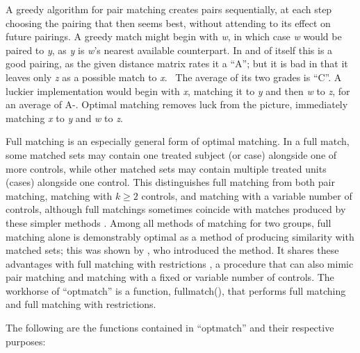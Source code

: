 \documentclass[12pt,twoside]{article}
\begin{document}
\bigskip

{\ttfamily
\textrm{ A greedy algorithm for pair matching creates pairs
sequentially, at each step choosing the pairing that then seems best,
without attending to its effect on future pairings. A greedy match
might begin with }\textrm{\textit{w}}\textrm{, in which case
}\textrm{\textit{w}}\textrm{ would be paired to
}\textrm{\textit{y}}\textrm{, as }\textrm{\textit{y}}\textrm{ is
}\textrm{\textit{w}}\textrm{'s nearest available counterpart. In and of
itself this is a good pairing, as the given distance matrix rates it a
``A''; but it is bad in that it leaves only
}\textrm{\textit{z}}\textrm{ as a possible match to
}\textrm{\textit{x}}\textrm{. \ The average of its two grades is ``C''.
A luckier implementation would begin with }\textrm{\textit{x}}\textrm{,
matching it to }\textrm{\textit{y}}\textrm{ and then
}\textrm{\textit{w}}\textrm{ to }\textrm{\textit{z}}\textrm{, for an
average of A{}-. Optimal matching removes luck from the picture,
immediately matching }\textrm{\textit{x}}\textrm{ to
}\textrm{\textit{y}}\textrm{ and }\textrm{\textit{w}} to \textit{z}. }

{\ttfamily
\textrm{ Full matching is an especially general form of optimal
matching. In a full match, some matched sets may contain one treated
subject (or case) alongside one of more controls, while other matched
sets may contain multiple treated units (cases) alongside one control.
This distinguishes full matching from both pair matching, matching with
}\textrm{ ${k\ge 2}$ }\textrm{controls, and matching with a variable
number of controls, although full matchings sometimes coincide with
matches produced by these simpler methods \citep{hansen:klopfer:2005}.
Among all methods of matching for two groups, full matching alone is
demonstrably optimal as a method of producing similarity with matched
sets; this was shown by \citet{rosenbaum:1991a}, who introduced the method. It
shares these advantages with full matching with restrictions \citep{hansen:klopfer:2005}, a procedure that can also mimic pair matching and
matching with a fixed or variable number of controls. The workhorse of
``optmatch'' is a function, }fullmatch()\textrm{, that performs full
matching and full matching with restrictions. }}


\bigskip


\bigskip

{\ttfamily
\textrm{The following are the functions contained in ``optmatch'' and
their respective purposes:}}
\end{document}
